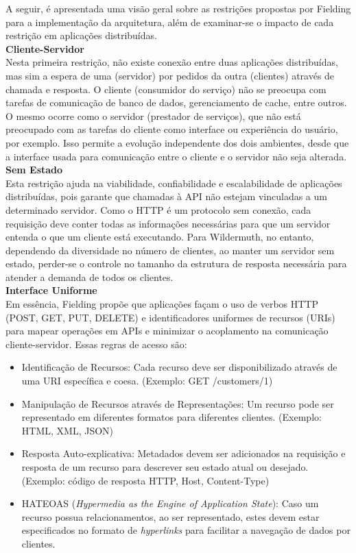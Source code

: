 A seguir, é apresentada uma visão geral sobre as restrições propostas por Fielding para a implementação da arquitetura, além de examinar-se o impacto de cada restrição em aplicações distribuídas. \\

\textbf{Cliente-Servidor} \\

Nesta primeira restrição, não existe conexão entre duas aplicações distribuídas, mas sim a espera de uma (servidor) por pedidos da outra (clientes) através de chamada e resposta. O cliente (consumidor do serviço) não se preocupa com tarefas de comunicação de banco de dados, gerenciamento de cache, entre outros. O mesmo ocorre como o servidor (prestador de serviços), que não está preocupado com as tarefas do cliente como interface ou experiência do usuário, por exemplo. Isso permite a evolução independente dos dois ambientes, desde que a interface usada para comunicação entre o cliente e o servidor não seja alterada. \cite{Fielding2000} \\

\textbf{Sem Estado} \\

Esta restrição ajuda na viabilidade, confiabilidade e escalabilidade de aplicações distribuídas, pois garante que chamadas à API não estejam vinculadas a um determinado servidor. Como o HTTP é um protocolo sem conexão, cada requisição deve conter todas as informações necessárias para que um servidor entenda o que um cliente está executando. Para Wildermuth, no entanto, dependendo da diversidade no número de clientes, ao manter um servidor sem estado, perder-se o controle no tamanho da estrutura de resposta necessária para atender a demanda de todos os clientes. \cite{Wildermuth2015} \\

\textbf{Interface Uniforme} \\

Em essência, Fielding propõe que aplicações façam o uso de verbos HTTP (POST, GET, PUT, DELETE) e identificadores uniformes de recursos (URIs) para mapear operações em APIs e minimizar o acoplamento na comunicação cliente-servidor. Essas regras de acesso são: \cite{Fielding2000}

\begin{itemize}
\item Identificação de Recursos: Cada recurso deve ser disponibilizado através de uma URI específica e coesa. (Exemplo: GET /customers/1)
\item Manipulação de Recursos através de Representações: Um recurso pode ser representado em diferentes formatos para diferentes clientes. (Exemplo: HTML, XML, JSON)
\item Resposta Auto-explicativa: Metadados devem ser adicionados na requisição e resposta de um recurso para descrever seu estado atual ou desejado. (Exemplo: código de resposta HTTP, Host, Content-Type)
\item HATEOAS (\textit{Hypermedia as the Engine of Application State}): Caso um recurso possua relacionamentos, ao ser representado, estes devem estar especificados no formato de \textit{hyperlinks} para facilitar a navegação de dados por clientes.
\end{itemize}


